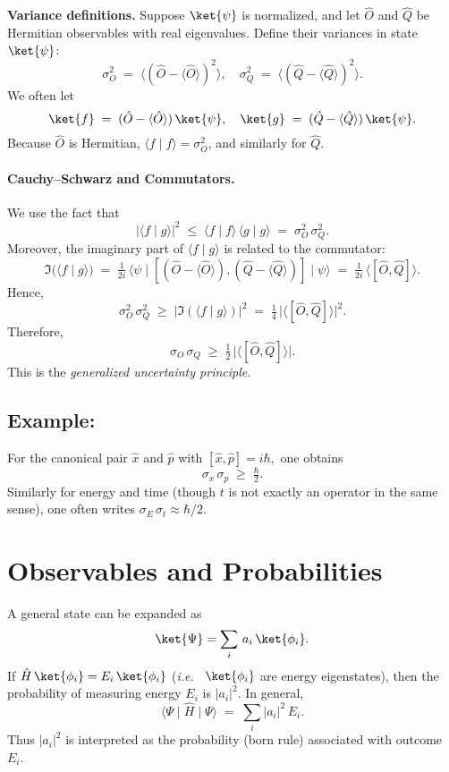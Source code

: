 \noindent
\textbf{Variance definitions.}  
Suppose $\ket{\psi}$ is normalized, and let $\hat{O}$ and $\hat{Q}$ be Hermitian observables with real eigenvalues.  Define their variances in state $\ket{\psi}$:
\[
\sigma_O^2 \;=\; \langle (\hat{O} - \langle \hat{O}\rangle)^2 \rangle,
\quad
\sigma_Q^2 \;=\; \langle (\hat{Q} - \langle \hat{Q}\rangle)^2 \rangle.
\]
We often let
\[
\ket{f} 
\;=\; (\hat{O} - \langle \hat{O}\rangle)\,\ket{\psi}, 
\quad
\ket{g} 
\;=\; (\hat{Q} - \langle \hat{Q}\rangle)\,\ket{\psi}.
\]
Because $\hat{O}$ is Hermitian, $\langle f\mid f\rangle = \sigma_O^2$, and similarly for $\hat{Q}$.

\paragraph{Cauchy–Schwarz and Commutators.}
We use the fact that 
\[
|\langle f \mid g \rangle|^2 
\;\le\;
\langle f \mid f \rangle\,\langle g \mid g \rangle 
\;=\; 
\sigma_O^2 \,\sigma_Q^2.
\]
Moreover, the imaginary part of $\langle f\mid g\rangle$ is related to the commutator:
\[
\Im\bigl(\langle f\mid g \rangle\bigr)
\;=\;
\tfrac{1}{2i}\,\langle \psi\mid [(\hat{O}-\langle \hat{O}\rangle),(\hat{Q}-\langle \hat{Q}\rangle)] \mid \psi\rangle
\;=\;
\tfrac{1}{2i}\,\langle [\hat{O},\hat{Q}] \rangle.
\]
Hence,
\[
\sigma_O^2\,\sigma_Q^2 
\;\ge\;
\bigl|\Im(\langle f\mid g\rangle)\bigr|^2
\;=\;
\tfrac{1}{4}\,\bigl|\langle [\hat{O}, \hat{Q}] \rangle \bigr|^2.
\]
Therefore,
\[
\sigma_O\,\sigma_Q \;\ge\; 
\tfrac{1}{2}\,\bigl|\langle [\hat{O},\hat{Q}] \rangle\bigr|.
\]
This is the \emph{generalized uncertainty principle}.

\subsection*{Example:}
For the canonical pair $\hat{x}$ and $\hat{p}$ with $[\hat{x}, \hat{p}] = i\hbar,$ one obtains
\[
\sigma_x\,\sigma_p 
\;\ge\; 
\tfrac{\hbar}{2}.
\]
Similarly for energy and time (though $t$ is not exactly an operator in the same sense), one often writes $\sigma_E\,\sigma_t \approx \hbar/2$.

\section*{Observables and Probabilities}

A general state can be expanded as
\[
\ket{\Psi} = \sum_i \, a_i \,\ket{\phi_i}.
\]
If $\hat{H}\,\ket{\phi_i} = E_i\,\ket{\phi_i}$ (\emph{i.e.\ } $\ket{\phi_i}$ are energy eigenstates), then the probability of measuring energy $E_i$ is $|a_i|^2$.  In general,
\[
\langle\Psi\mid \hat{H} \mid\Psi\rangle 
\;=\;
\sum_i |a_i|^2\,E_i.
\]
Thus $|a_i|^2$ is interpreted as the probability (born rule) associated with outcome $E_i$.

